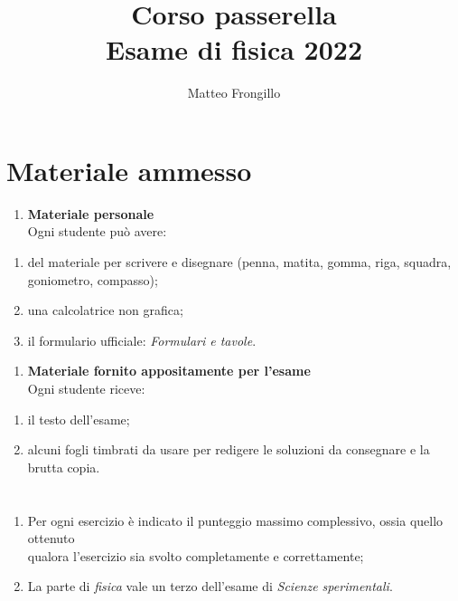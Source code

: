\documentclass{article}
\begin{document}
\title{\textbf{Corso passerella \\ Esame di fisica 2022}}
\author{Matteo Frongillo}

\maketitle
\section*{\centering Materiale ammesso}
\begin{enumerate}[label=\textbf{\alph*)}]
    \item \textbf{Materiale personale} \\ Ogni studente può avere:
\end{enumerate}
\begin{enumerate}[label=\textbf{\roman*)}, leftmargin=1.5cm]
    \item del materiale per scrivere e disegnare (penna, matita, gomma, riga, squadra, goniometro, compasso);
    \item una calcolatrice non grafica;
    \item il formulario ufficiale: \textit{Formulari e tavole}.
\end{enumerate}
\begin{enumerate}[label=\textbf{\alph*)}, start=2]
    \item \textbf{Materiale fornito appositamente per l'esame} \\
        Ogni studente riceve:
\end{enumerate}
\begin{enumerate}[label=\textbf{\roman*)}, leftmargin=1.5cm]
    \item il testo dell'esame;
    \item alcuni fogli timbrati da usare per redigere le soluzioni da consegnare e la brutta copia.
\end{enumerate}

\section* {}

\begin{enumerate}[label=\textbf{\alph*)}]
    \item Per ogni esercizio è indicato il punteggio
        massimo complessivo, ossia quello ottenuto \\ qualora l'esercizio
        sia svolto completamente e correttamente;
    \item La parte di \textit{fisica} vale un terzo dell'esame di \textit{Scienze sperimentali}.
\end{enumerate}
\end{document}
